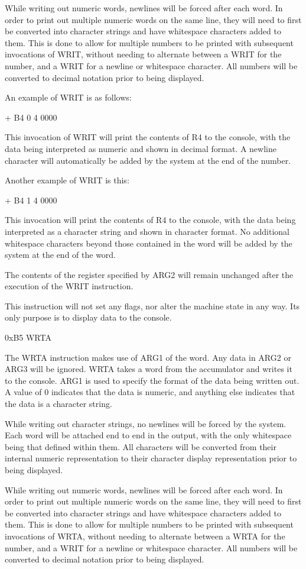 \documentclass[]{article}
\begin{document}
While writing out numeric words, newlines will be forced after each
word. In order to print out multiple numeric words on the same line,
they will need to first be converted into character strings and have
whitespace characters added to them. This is done to allow for multiple
numbers to be printed with subsequent invocations of WRIT, without
needing to alternate between a WRIT for the number, and a WRIT for a
newline or whitespace character. All numbers will be converted to
decimal notation prior to being displayed.

An example of WRIT is as follows:

+ B4 0 4 0000

This invocation of WRIT will print the contents of R4 to the console,
with the data being interpreted as numeric and shown in decimal format.
A newline character will automatically be added by the system at the end
of the number.

Another example of WRIT is this:

+ B4 1 4 0000

This invocation will print the contents of R4 to the console, with the
data being interpreted as a character string and shown in character
format. No additional whitespace characters beyond those contained in
the word will be added by the system at the end of the word.

The contents of the register specified by ARG2 will remain unchanged
after the execution of the WRIT instruction.

This instruction will not set any flags, nor alter the machine state in
any way. Its only purpose is to display data to the console.

0xB5 WRTA

The WRTA instruction makes use of ARG1 of the word. Any data in ARG2 or
ARG3 will be ignored. WRTA takes a word from the accumulator and writes
it to the console. ARG1 is used to specify the format of the data being
written out. A value of 0 indicates that the data is numeric, and
anything else indicates that the data is a character string.

While writing out character strings, no newlines will be forced by the
system. Each word will be attached end to end in the output, with the
only whitespace being that defined within them. All characters will be
converted from their internal numeric representation to their character
display representation prior to being displayed.

While writing out numeric words, newlines will be forced after each
word. In order to print out multiple numeric words on the same line,
they will need to first be converted into character strings and have
whitespace characters added to them. This is done to allow for multiple
numbers to be printed with subsequent invocations of WRTA, without
needing to alternate between a WRTA for the number, and a WRIT for a
newline or whitespace character. All numbers will be converted to
decimal notation prior to being displayed.
\end{document}
